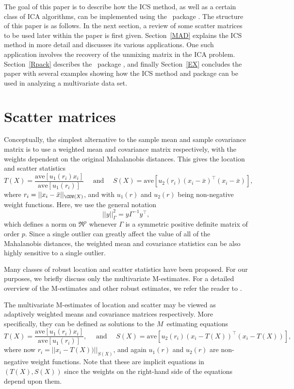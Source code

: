 \documentclass[article,nojss]{jss}
\newcommand{\ave}{\mathrm{ave}}
\begin{document}
The goal of this paper is to describe how the {ICS} method, as well as a certain class of {ICA} algorithms, can be
implemented using the ~package . The structure of this paper is as follows. In the next section,
a review of some scatter matrices to be used later within the paper is first given.
Section~\ref{MAD} explains the {ICS} method in more detail and discusses its various applications.
One such application involves the recovery of the unmixing matrix in the {ICA} problem.
Section~\ref{Rpack} describes the ~package , and finally Section~\ref{EX}
concludes the paper with several examples showing how the {ICS} method and package
can be used in analyzing a multivariate data set.


\section{Scatter matrices} \label{Scatter}

Conceptually, the simplest alternative to the sample mean and sample
covariance matrix is to use a weighted mean and covariance matrix
respectively, with the weights dependent on the original Mahalanobis
distances. This gives the location and scatter statistics
\[
T(X) = \frac{\ave [u_1(r_i)x_i]}{\ave [u_1(r_i)]} \quad \mbox{ and } \quad
S(X) = \ave [u_2(r_i)(x_i-\bar{x})^\top (x_i-\bar{x})],
\]
where $r_i = || x_i - \bar{x} ||_{\COV(X)}$, and with $u_1(r)$ and $u_2(r)$ being non-negative weight functions.
Here, we use the general notation
\[ ||y||_{\Gamma}^2 =  y\Gamma^{-1}y^\top,
\]
which defines a norm on $\Re^p$ whenever $\Gamma$ is a symmetric positive definite matrix of order $p$.
Since a single outlier can greatly affect the value of all of the Mahalanobis distances, the weighted mean
and covariance statistics can be also highly sensitive to a single outlier.

Many classes of robust location and scatter statistics have been proposed.  For our purposes, we briefly discuss only
the multivariate {M}-estimates. For a detailed overview of the {M}-estimates and other robust estimates, we
refer the reader to \citet{MaronnaMartinYohai2006}.

The multivariate {M}-estimates of location and scatter may be viewed as adaptively weighted means and covariance
matrices respectively.  More specifically, they can be defined as solutions to the $M$~estimating equations
\[
T(X) = \frac{\ave [u_1(r_i)x_i]}{\ave [u_1(r_i)]}, \quad \mbox{ and } \quad
S(X) = \ave [u_2(r_i)(x_i-T(X))^\top (x_i-T(X))],
\]
where now $r_i = ||x_i-T(X))||_{S(X)}$, and again $u_1(r)$ and $u_2(r)$ are non-negative weight functions.
Note that these are implicit equations in $(T(X),S(X))$ since the weights on the right-hand side of the equations
depend upon them.
\end{document}
